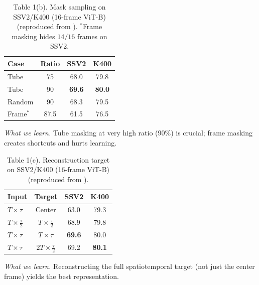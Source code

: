 \begin{enrichment}
\begin{enrichment}
    \begin{table}[H]
        \centering
        \small
        \setlength{\tabcolsep}{6pt}
        \caption{Table 1(b). Mask sampling on SSV2/K400 (16-frame ViT-B) (reproduced from \cite{tong2022_videomae}). $^\ast$Frame masking hides $14/16$ frames on SSV2.}
        \label{tab:videomae_tbl1b}
        \begin{tabular}{lccc}
            \toprule
            Case & Ratio & SSV2 & K400 \\
            \midrule
            Tube   & 75   & 68.0 & 79.8 \\
            Tube   & 90   & \textbf{69.6} & \textbf{80.0} \\
            Random & 90   & 68.3 & 79.5 \\
            Frame$^\ast$ & 87.5 & 61.5 & 76.5 \\
            \bottomrule
        \end{tabular}
    \end{table}
    \noindent\emph{What we learn.} Tube masking at very high ratio (90\%) is crucial; frame masking creates shortcuts and hurts learning.
    
    \begin{table}[H]
        \centering
        \small
        \setlength{\tabcolsep}{6pt}
        \caption{Table 1(c). Reconstruction target on SSV2/K400 (16-frame ViT-B) (reproduced from \cite{tong2022_videomae}).}
        \label{tab:videomae_tbl1c}
        \begin{tabular}{lccc}
            \toprule
            Input & Target & SSV2 & K400 \\
            \midrule
            $T{\times}\tau$                    & Center                 & 63.0 & 79.3 \\
            $T{\times}\tfrac{\tau}{2}$         & $T{\times}\tfrac{\tau}{2}$ & 68.9 & 79.8 \\
            $T{\times}\tau$                    & $T{\times}\tau$            & \textbf{69.6} & {80.0} \\
            $T{\times}\tau$                    & $2T{\times}\tfrac{\tau}{2}$ & 69.2 & \textbf{80.1} \\
            \bottomrule
        \end{tabular}
    \end{table}
    \noindent\emph{What we learn.} Reconstructing the full spatiotemporal target (not just the center frame) yields the best representation.
    

\end{enrichment}
\end{enrichment}
